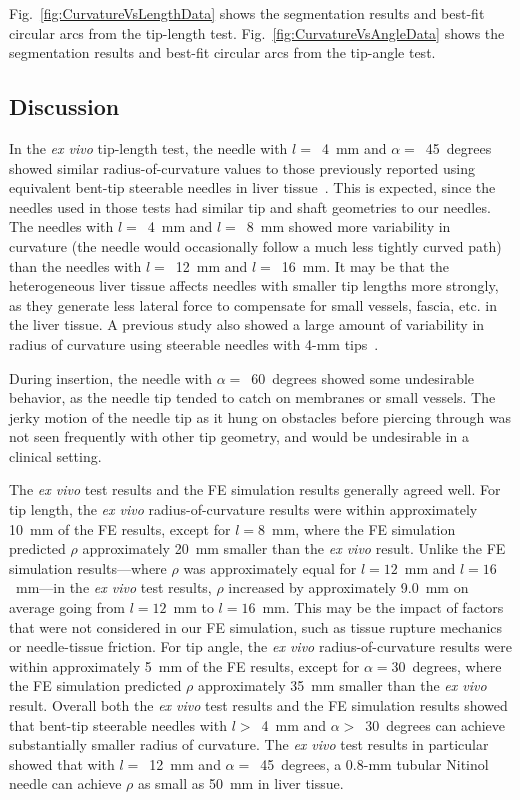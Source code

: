 Fig.~\ref{fig:CurvatureVsLengthData} shows the segmentation results and best-fit circular arcs from the tip-length test. Fig.~\ref{fig:CurvatureVsAngleData} shows the segmentation results and best-fit circular arcs from the tip-angle test.  

\subsection{Discussion}
In the \textit{ex vivo} tip-length test, the needle with $l =$~4~mm and $\alpha =$~45~degrees showed similar radius-of-curvature values to those previously reported using equivalent bent-tip steerable needles in liver tissue~\cite{Patil2014,Swaney2013}. This is expected, since the needles used in those tests had similar tip and shaft geometries to our needles. The needles with $l =$~4~mm and $l =$~8~mm showed more variability in curvature (the needle would occasionally follow a much less tightly curved path) than the needles with $l =$~12~mm and $l =$~16~mm. It may be that the heterogeneous liver tissue affects needles with smaller tip lengths more strongly, as they generate less lateral force to compensate for small vessels, fascia, etc. in the liver tissue. A previous study also showed a large amount of variability in radius of curvature using steerable needles with 4-mm tips~\cite{Majewicz2010}.

During insertion, the needle with $\alpha =$~60~degrees showed some undesirable behavior, as the needle tip tended to catch on membranes or small vessels. The jerky motion of the needle tip as it hung on obstacles before piercing through was not seen frequently with other tip geometry, and would be undesirable in a clinical setting.

The \textit{ex vivo} test results and the FE simulation results generally agreed well. For tip length, the \textit{ex vivo} radius-of-curvature results were within approximately 10~mm of the FE results, except for $l = 8$~mm, where the FE simulation predicted $\rho$ approximately 20~mm smaller than the \textit{ex vivo} result. Unlike the FE simulation results---where $\rho$ was approximately equal for $l = 12$~mm and $l = 16$~mm---in the \textit{ex vivo} test results, $\rho$ increased by approximately 9.0~mm on average going from $l = 12$~mm to $l = 16$~mm. This may be the impact of factors that were not considered in our FE simulation, such as tissue rupture mechanics or needle-tissue friction. For tip angle, the \textit{ex vivo} radius-of-curvature results were within approximately 5~mm of the FE results, except for $\alpha = 30$~degrees, where the FE simulation predicted $\rho$ approximately 35~mm smaller than the \textit{ex vivo} result. Overall both the \textit{ex vivo} test results and the FE simulation results showed that bent-tip steerable needles with $l >$~4~mm and $\alpha >$~30~degrees can achieve substantially smaller radius of curvature. The \textit{ex vivo} test results in particular showed that with $l =$~12~mm and $\alpha =$~45~degrees, a 0.8-mm tubular Nitinol needle can achieve $\rho$ as small as 50~mm in liver tissue.

